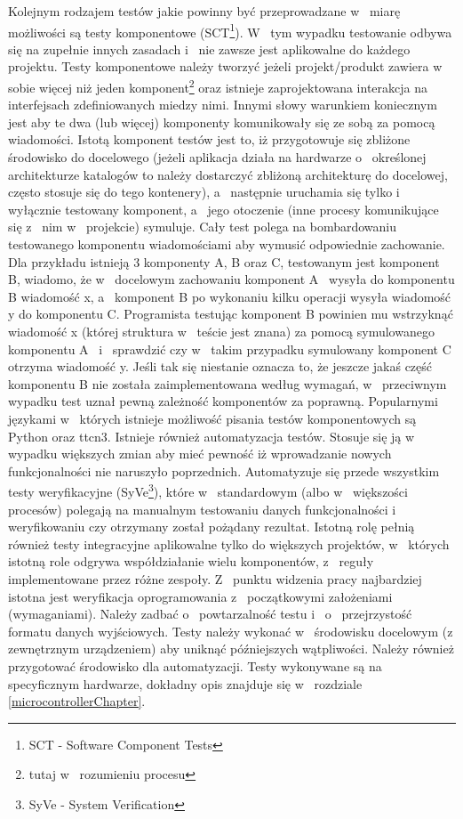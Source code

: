 \documentclass{BscUS}
\begin{document}
\indent Kolejnym rodzajem testów jakie powinny być przeprowadzane w~ miarę możliwości są testy komponentowe (SCT\footnote{SCT - Software Component Tests}). W~ tym wypadku testowanie odbywa się na zupełnie innych zasadach i~ nie zawsze jest aplikowalne do każdego projektu. Testy komponentowe należy tworzyć jeżeli projekt/produkt zawiera w~ sobie więcej niż jeden komponent\footnote{tutaj w~ rozumieniu procesu} oraz istnieje zaprojektowana interakcja na interfejsach zdefiniowanych miedzy nimi. Innymi słowy warunkiem koniecznym jest aby te dwa (lub więcej) komponenty komunikowały się ze sobą za pomocą wiadomości. Istotą komponent testów jest to, iż przygotowuje się zbliżone środowisko do docelowego (jeżeli aplikacja działa na hardwarze o~ określonej architekturze katalogów to należy dostarczyć zbliżoną architekturę do docelowej, często stosuje się do tego kontenery), a~ następnie uruchamia się tylko i~ wyłącznie testowany komponent, a~ jego otoczenie (inne procesy komunikujące się z~ nim w~ projekcie) symuluje. Cały test polega na bombardowaniu testowanego komponentu wiadomościami aby wymusić odpowiednie zachowanie. Dla przykładu istnieją 3 komponenty A, B oraz C, testowanym jest komponent B, wiadomo, że w~ docelowym zachowaniu komponent A~ wysyła do komponentu B wiadomość x, a~ komponent B po wykonaniu kilku operacji wysyła wiadomość y do komponentu C. Programista testując komponent B powinien mu wstrzyknąć wiadomość x (której struktura w~ teście jest znana) za pomocą symulowanego komponentu A~ i~ sprawdzić czy w~ takim przypadku symulowany komponent C otrzyma wiadomość y. Jeśli tak się niestanie oznacza to, że jeszcze jakaś część komponentu B nie została zaimplementowana według wymagań, w~ przeciwnym wypadku test uznał pewną zależność komponentów za poprawną. Popularnymi językami w~ których istnieje możliwość pisania testów komponentowych są Python oraz ttcn3.
\newline
\indent Istnieje również automatyzacja testów. Stosuje się ją w~ wypadku większych zmian aby mieć pewność iż wprowadzanie nowych funkcjonalności nie naruszyło poprzednich. Automatyzuje się przede wszystkim testy weryfikacyjne (SyVe\footnote{SyVe - System Verification}), które w~ standardowym (albo w~ większości procesów) polegają na manualnym testowaniu danych funkcjonalności i~ weryfikowaniu czy otrzymany został pożądany rezultat. Istotną rolę pełnią również testy integracyjne aplikowalne tylko do większych projektów, w~ których istotną role odgrywa współdziałanie wielu komponentów, z~ reguły implementowane przez różne zespoły.
\newline
\indent Z~ punktu widzenia pracy najbardziej istotna jest weryfikacja oprogramowania z~ początkowymi założeniami (wymaganiami). Należy zadbać o~ powtarzalność testu i~ o~ przejrzystość formatu danych wyjściowych. Testy należy wykonać w~ środowisku docelowym (z zewnętrznym urządzeniem) aby uniknąć późniejszych wątpliwości. Należy również przygotować środowisko dla automatyzacji. Testy wykonywane są na specyficznym hardwarze, dokładny opis znajduje się w~ rozdziale \ref{microcontrollerChapter}.
\end{document}
